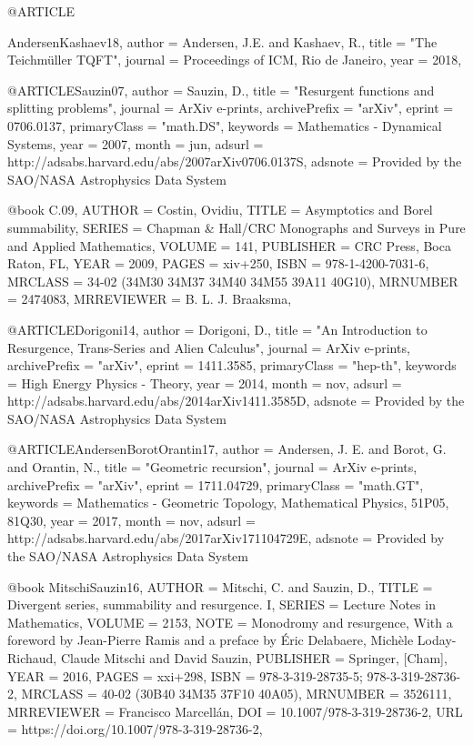 @ARTICLE{AndersenKashaev18,
   author = {Andersen, J.E. and Kashaev, R.},
    title = "{{T}he {T}eichmüller {TQFT}}",
  journal = {Proceedings of ICM, Rio de Janeiro},
     year = 2018,
  
}

@ARTICLE{Sauzin07,
   author = {{Sauzin}, D.},
    title = "{Resurgent functions and splitting problems}",
  journal = {ArXiv e-prints},
archivePrefix = "arXiv",
   eprint = {0706.0137},
 primaryClass = "math.DS",
 keywords = {Mathematics - Dynamical Systems},
     year = 2007,
    month = jun,
   adsurl = {http://adsabs.harvard.edu/abs/2007arXiv0706.0137S},
  adsnote = {Provided by the SAO/NASA Astrophysics Data System}
}

@book {C.09,
    AUTHOR = {Costin, Ovidiu},
     TITLE = {Asymptotics and {B}orel summability},
    SERIES = {Chapman \& Hall/CRC Monographs and Surveys in Pure and Applied
              Mathematics},
    VOLUME = {141},
 PUBLISHER = {CRC Press, Boca Raton, FL},
      YEAR = {2009},
     PAGES = {xiv+250},
      ISBN = {978-1-4200-7031-6},
   MRCLASS = {34-02 (34M30 34M37 34M40 34M55 39A11 40G10)},
  MRNUMBER = {2474083},
MRREVIEWER = {B. L. J. Braaksma},
}

@ARTICLE{Dorigoni14,
   author = {{Dorigoni}, D.},
    title = "{An Introduction to Resurgence, Trans-Series and Alien Calculus}",
  journal = {ArXiv e-prints},
archivePrefix = "arXiv",
   eprint = {1411.3585},
 primaryClass = "hep-th",
 keywords = {High Energy Physics - Theory},
     year = 2014,
    month = nov,
   adsurl = {http://adsabs.harvard.edu/abs/2014arXiv1411.3585D},
  adsnote = {Provided by the SAO/NASA Astrophysics Data System}
}


@ARTICLE{AndersenBorotOrantin17,
   author = {{Andersen}, J. E. and {Borot}, G. and {Orantin}, N.},
    title = "{Geometric recursion}",
  journal = {ArXiv e-prints},
archivePrefix = "arXiv",
   eprint = {1711.04729},
 primaryClass = "math.GT",
 keywords = {Mathematics - Geometric Topology, Mathematical Physics, 51P05, 81Q30},
     year = 2017,
    month = nov,
   adsurl = {http://adsabs.harvard.edu/abs/2017arXiv171104729E},
  adsnote = {Provided by the SAO/NASA Astrophysics Data System}
}

@book {MitschiSauzin16,
    AUTHOR = {Mitschi, C. and Sauzin, D.},
     TITLE = {Divergent series, summability and resurgence. {I}},
    SERIES = {Lecture Notes in Mathematics},
    VOLUME = {2153},
      NOTE = {Monodromy and resurgence,
              With a foreword by Jean-Pierre Ramis and a preface by \'{E}ric
              Delabaere, Mich\`ele Loday-Richaud, Claude Mitschi and David
              Sauzin},
 PUBLISHER = {Springer, [Cham]},
      YEAR = {2016},
     PAGES = {xxi+298},
      ISBN = {978-3-319-28735-5; 978-3-319-28736-2},
   MRCLASS = {40-02 (30B40 34M35 37F10 40A05)},
  MRNUMBER = {3526111},
MRREVIEWER = {Francisco Marcell\'{a}n},
       DOI = {10.1007/978-3-319-28736-2},
       URL = {https://doi.org/10.1007/978-3-319-28736-2},
}

